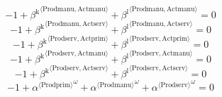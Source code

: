 \begin{equation}
-1 + {\beta^{\mathrm{k}}}^{\langle \mathrm{\mathrm{Prodmanu}},\mathrm{\mathrm{Actmanu}}\rangle} + {\beta^{\mathrm{l}}}^{\langle \mathrm{\mathrm{Prodmanu}},\mathrm{\mathrm{Actmanu}}\rangle} = 0
\end{equation}
\begin{equation}
-1 + {\beta^{\mathrm{k}}}^{\langle \mathrm{\mathrm{Prodmanu}},\mathrm{\mathrm{Actserv}}\rangle} + {\beta^{\mathrm{l}}}^{\langle \mathrm{\mathrm{Prodmanu}},\mathrm{\mathrm{Actserv}}\rangle} = 0
\end{equation}
\begin{equation}
-1 + {\beta^{\mathrm{k}}}^{\langle \mathrm{\mathrm{Prodserv}},\mathrm{\mathrm{Actprim}}\rangle} + {\beta^{\mathrm{l}}}^{\langle \mathrm{\mathrm{Prodserv}},\mathrm{\mathrm{Actprim}}\rangle} = 0
\end{equation}
\begin{equation}
-1 + {\beta^{\mathrm{k}}}^{\langle \mathrm{\mathrm{Prodserv}},\mathrm{\mathrm{Actmanu}}\rangle} + {\beta^{\mathrm{l}}}^{\langle \mathrm{\mathrm{Prodserv}},\mathrm{\mathrm{Actmanu}}\rangle} = 0
\end{equation}
\begin{equation}
-1 + {\beta^{\mathrm{k}}}^{\langle \mathrm{\mathrm{Prodserv}},\mathrm{\mathrm{Actserv}}\rangle} + {\beta^{\mathrm{l}}}^{\langle \mathrm{\mathrm{Prodserv}},\mathrm{\mathrm{Actserv}}\rangle} = 0
\end{equation}
\begin{equation}
-1 + {{\alpha}^{\langle \mathrm{\mathrm{Prodprim}}\rangle}}^{\omega} + {{\alpha}^{\langle \mathrm{\mathrm{Prodmanu}}\rangle}}^{\omega} + {{\alpha}^{\langle \mathrm{\mathrm{Prodserv}}\rangle}}^{\omega} = 0
\end{equation}





